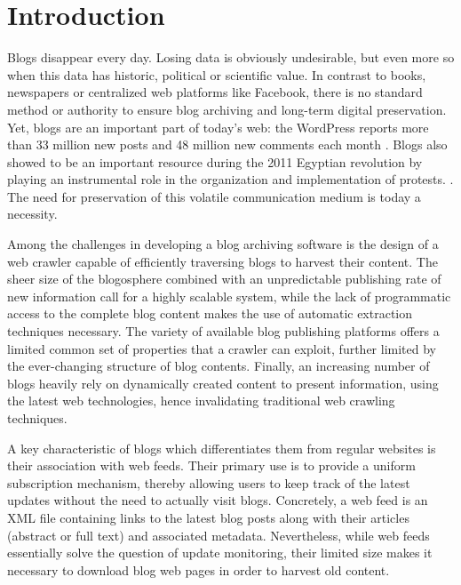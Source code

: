 \section{Introduction}

Blogs disappear every day. Losing data is obviously undesirable, but even more so when this data has historic, political or scientific value. In contrast to books, newspapers or centralized web platforms like Facebook, there is no standard method or authority to ensure blog archiving and long-term digital preservation. Yet, blogs are an important part of today's web: the WordPress reports more than 33 million new posts and 48 million new comments each month \cite{wordpress2014}. Blogs also showed to be an important resource during the 2011 Egyptian revolution by playing an instrumental role in the organization and implementation of protests. \cite{nahedeltantawy2012}. The need for preservation of this volatile communication medium is today a necessity.  

Among the challenges in developing a blog archiving software is the design of a web crawler capable of efficiently traversing blogs to harvest their content. The sheer size of the blogosphere combined with an unpredictable publishing rate of new information call for a highly scalable system, while the lack of programmatic access to the complete blog content makes the use of automatic extraction techniques necessary. The variety of available blog publishing platforms offers a limited common set of properties that a crawler can exploit, further limited by the ever-changing structure of blog contents. Finally, an increasing number of blogs heavily rely on dynamically created content to present information, using the latest web technologies, hence invalidating traditional web crawling techniques.

A key characteristic of blogs which differentiates them from regular websites is their association with web feeds. Their primary use is to provide a uniform subscription mechanism, thereby allowing users to keep track of the latest updates without the need to actually visit blogs. Concretely, a web feed is an XML file containing links to the latest blog posts along with their articles (abstract or full text) and associated metadata. Nevertheless, while web feeds essentially solve the question of update monitoring, their limited size makes it necessary to download blog web pages in order to harvest old content.

